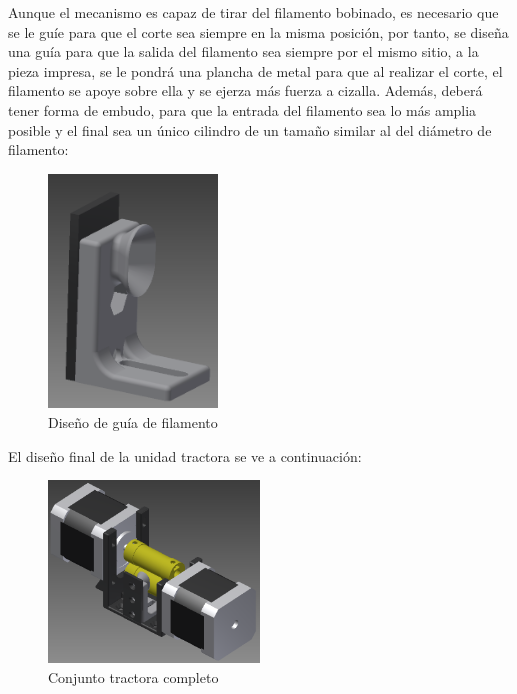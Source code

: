 Aunque el mecanismo es capaz de tirar del filamento bobinado, es necesario que se le guíe para que el corte sea siempre en la misma posición, por tanto, se diseña una guía para que la salida del filamento sea siempre por el mismo sitio, a la pieza impresa, se le pondrá una plancha de metal para que al realizar el corte, el filamento se apoye sobre ella y se ejerza más fuerza a cizalla. Además, deberá tener forma de embudo, para que la entrada del filamento sea lo más amplia posible y el final sea un único cilindro de un tamaño similar al del diámetro de filamento:

    \begin{figure}[H]
            \centering
            \includegraphics[width=0.4\textwidth]{images/peletizadora/guia.png}
            \caption{Diseño de guía de filamento}
            \label{fig:peletizadora_guia}
    \end{figure}

El diseño final de la unidad tractora se ve a continuación:

    \begin{figure}[H]
            \centering
            \includegraphics[width=0.5\textwidth]{images/peletizadora/conjunto_tractora.png}
            \caption{Conjunto tractora completo}
            \label{fig:peletizadora_conjunto}
    \end{figure}

